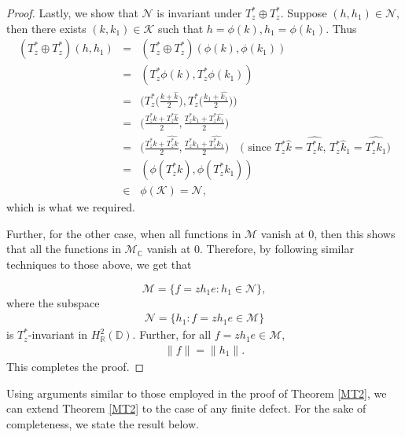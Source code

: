 \documentclass[11pt]{amsart}
\numberwithin{equation}{section}
\begin{document}
\begin{proof}
Lastly, we show that $\mathcal{N}$ is invariant under $T^*_z\oplus T^*_z$. Suppose $(h,h_1)\in \mathcal{N}$, then there exists $(k, k_1)\in \mathcal{K}$ such that $h=\phi(k), h_1=\phi(k_1)$. Thus 
\begin{eqnarray*}
    (T^*_z\oplus T^*_z) (h,h_1) &=& (T^*_z\oplus T^*_z)(\phi(k),\phi(k_1))\\
    &=& (T^*_z\phi(k),T^*_z\phi(k_1))\\
    &=& \bigg(T^*_z\bigg(\frac{k+\widehat{k}}{2}\bigg), T^*_z\bigg(\frac{k_1+\widehat{k_1}}{2}\bigg) \bigg)\\
    &=& \bigg(\frac{T^*_zk+T^*_z\widehat{k}}{2}, \frac{T^*_zk_1+T^*_z\widehat{k_1}}{2}\bigg) \\
    &=& \bigg(\frac{T^*_zk+\widehat{T^*_zk}}{2}, \frac{T^*_zk_1+\widehat{T^*_zk_1}}{2}\bigg) \quad \text{( since $T^*_z\widehat{k}=\widehat{T^*_zk}$, $T^*_z\widehat{k}_1=\widehat{T^*_zk_1}$)}\\
    &=& (\phi(T^*_zk), \phi(T^*_zk_1))\\
    &\in &\phi(\mathcal{K})=\mathcal{N},
\end{eqnarray*}
which is what we required.


 Further, for the other case, when all functions in $\mathcal{M}$ vanish at $0$, then this shows that all the functions in $\mathcal{M}_{\mathbb{C}}$ vanish at $0$. Therefore, by following similar techniques to those above, we get that 
 
 $$\mathcal{M}=\Big\{f=zh_1e : h_1\in \mathcal{N}\Big\},$$
where the subspace
\begin{eqnarray*}
    \mathcal{N}=\Big\{h_1: f=zh_1e\in \mathcal{M}\Big\}
\end{eqnarray*}
is $T^*_z$-invariant in $H^2_{\mathbb{R}}(\mathbb{D})$. Further, for all $f=zh_1e \in \mathcal{M}$,
\begin{eqnarray*}
    \|f\|=\|h_1\|.
\end{eqnarray*}
This completes the proof.
\end{proof}

\textnormal{Using arguments similar to those employed in the proof of Theorem \ref{MT2}, we can extend Theorem \ref{MT2} to the case of any finite defect. For the sake of completeness, we state the result below.}
\end{document}
